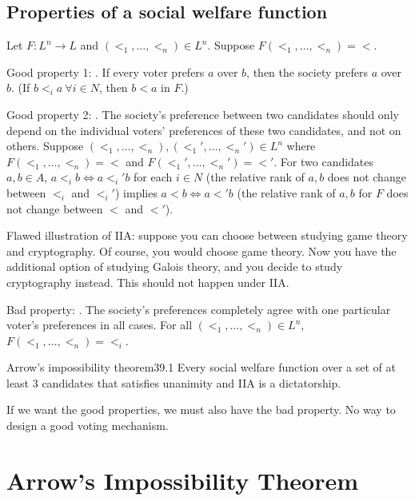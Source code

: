\documentclass[12pt,letterpaper]{report}
\begin{document}
\subsection{Properties of a social welfare function}

Let $F \colon L^n \to L$ and $(<_1, \ldots, <_n) \in L^n$.
Suppose $F(<_1, \ldots, <_n) = {<}$.

Good property 1: .
If every voter prefers $a$ over $b$, then the society prefers $a$ over $b$.
(If $b <_i a \ \forall i \in N$, then $b < a$ in $F$.)

Good property 2: .
The society's preference between two candidates should only depend on the individual voters'
preferences of these two candidates, and not on others.
Suppose $(<_1, \ldots, <_n), (<_1', \ldots, <_n') \in L^n$ where $F(<_1, \ldots, <_n) = {<}$ and
$F(<_1', \ldots, <_n') = {<'}$.
For two candidates $a, b \in A$, $a <_i b \iff a <_i' b$ for each $i \in N$ (the relative rank of
$a, b$ does not change between $<_i$ and $<_i'$) implies $a < b \iff a <' b$ (the relative rank of
$a, b$ for $F$ does not change between $<$ and $<'$).

Flawed illustration of IIA: suppose you can choose between studying game theory and cryptography.
Of course, you would choose game theory.
Now you have the additional option of studying Galois theory, and you decide to study cryptography
instead.
This should not happen under IIA.

Bad property: .
The society's preferences completely agree with one particular voter's preferences in all cases.
For all $(<_1, \ldots, <_n) \in L^n$, $F(<_1, \ldots, <_n) = {<_i}$.

\begin{thm}{Arrow's impossibility theorem}{39.1}
  Every social welfare function over a set of at least 3 candidates that satisfies unanimity and IIA
  is a dictatorship.
\end{thm}

If we want the good properties, we must also have the bad property.
No way to design a good voting mechanism.

\section{Arrow's Impossibility Theorem}
\end{document}
